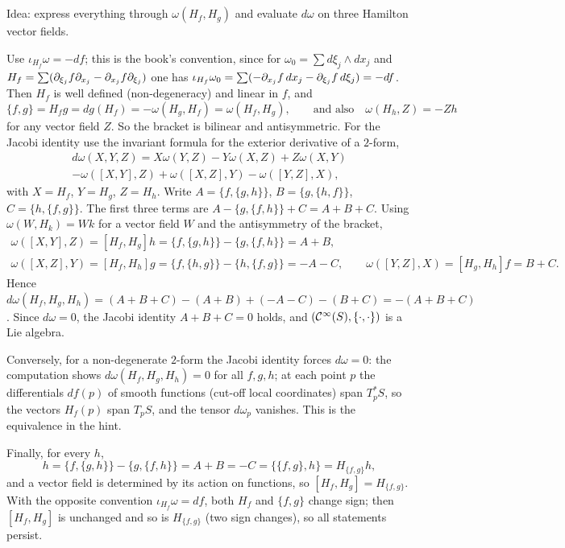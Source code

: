 \subsection*{}
Idea: express everything through $\omega(H_f,H_g)$ and evaluate $d\omega$ on three Hamilton
vector fields.

Use $\iota_{H_f}\omega=-df$; this is the book's convention, since for
$\omega_0=\sum d\xi_j\wedge dx_j$ and $H_f=\sum(\partial_{\xi_j}f\partial_{x_j}-\partial_{x_j}f\partial_{\xi_j})$ one has
$\iota_{H_f}\omega_0=\sum(-\partial_{x_j}f\,dx_j-\partial_{\xi_j}f\,d\xi_j)=-df$. Then $H_f$ is well defined
(non-degeneracy) and linear in $f$, and
\begin{equation*}
  \{f,g\}=H_fg=dg(H_f)=-\omega(H_g,H_f)=\omega(H_f,H_g),\qquad\text{and also}\quad
  \omega(H_h,Z)=-Zh
\end{equation*}
for any vector field $Z$. So the bracket is bilinear and antisymmetric. For the Jacobi identity
use the invariant formula for the exterior derivative of a $2$-form,
\begin{multline*}
  d\omega(X,Y,Z)=X\omega(Y,Z)-Y\omega(X,Z)+Z\omega(X,Y)\\
  -\omega([X,Y],Z)+\omega([X,Z],Y)-\omega([Y,Z],X),
\end{multline*}
with $X=H_f$, $Y=H_g$, $Z=H_h$. Write $A=\{f,\{g,h\}\}$, $B=\{g,\{h,f\}\}$, $C=\{h,\{f,g\}\}$.
The first three terms are $A-\{g,\{f,h\}\}+C=A+B+C$. Using $\omega(W,H_k)=Wk$ for a vector field
$W$ and the antisymmetry of the bracket,
\begin{gather*}
  \omega([X,Y],Z)=[H_f,H_g]h=\{f,\{g,h\}\}-\{g,\{f,h\}\}=A+B,\\
  \omega([X,Z],Y)=[H_f,H_h]g=\{f,\{h,g\}\}-\{h,\{f,g\}\}=-A-C,\qquad
  \omega([Y,Z],X)=[H_g,H_h]f=B+C .
\end{gather*}
Hence $d\omega(H_f,H_g,H_h)=(A+B+C)-(A+B)+(-A-C)-(B+C)=-(A+B+C)$. Since $d\omega=0$, the
Jacobi identity $A+B+C=0$ holds, and $(\mathcal{C}^\infty(S),\{\cdot,\cdot\})$ is a Lie algebra.

Conversely, for a non-degenerate $2$-form the Jacobi identity forces $d\omega=0$: the computation
shows $d\omega(H_f,H_g,H_h)=0$ for all $f,g,h$; at each point $p$ the differentials $df(p)$ of
smooth functions (cut-off local coordinates) span $T^*_pS$, so the vectors $H_f(p)$ span $T_pS$,
and the tensor $d\omega_p$ vanishes. This is the equivalence in the hint.

Finally, for every $h$,
\begin{equation*}
  [H_f,H_g]h=\{f,\{g,h\}\}-\{g,\{f,h\}\}=A+B=-C=\{\{f,g\},h\}=H_{\{f,g\}}h,
\end{equation*}
and a vector field is determined by its action on functions, so $[H_f,H_g]=H_{\{f,g\}}$. With the
opposite convention $\iota_{H_f}\omega=df$, both $H_f$ and $\{f,g\}$ change sign; then
$[H_f,H_g]$ is unchanged and so is $H_{\{f,g\}}$ (two sign changes), so all statements persist.

